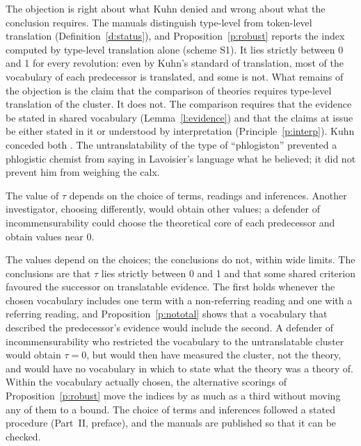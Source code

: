 \documentclass{situationist-preprint}
\begin{document}
\begin{reply}
The objection is right about what Kuhn denied and wrong about what the conclusion requires. The manuals distinguish type-level from token-level translation (Definition~\ref{d:status}), and Proposition~\ref{p:robust} reports the index computed by type-level translation alone (scheme S1). It lies strictly between 0 and 1 for every revolution: even by Kuhn's standard of translation, most of the vocabulary of each predecessor is translated, and some is not. What remains of the objection is the claim that the comparison of theories requires type-level translation of the cluster. It does not. The comparison requires that the evidence be stated in shared vocabulary (Lemma~\ref{l:evidence}) and that the claims at issue be either stated in it or understood by interpretation (Principle~\ref{p:interp}). Kuhn conceded both \citep{Kuhn1983}. The untranslatability of the type of \enquote{phlogiston} prevented a phlogistic chemist from saying in Lavoisier's language what he believed; it did not prevent him from weighing the calx.
\end{reply}

\begin{objection}
The value of $\tau$ depends on the choice of terms, readings and inferences. Another investigator, choosing differently, would obtain other values; a defender of incommensurability could choose the theoretical core of each predecessor and obtain values near 0.
\end{objection}

\begin{reply}
The values depend on the choices; the conclusions do not, within wide limits. The conclusions are that $\tau$ lies strictly between 0 and 1 and that some shared criterion favoured the successor on translatable evidence. The first holds whenever the chosen vocabulary includes one term with a non-referring reading and one with a referring reading, and Proposition~\ref{p:nototal} shows that a vocabulary that described the predecessor's evidence would include the second. A defender of incommensurability who restricted the vocabulary to the untranslatable cluster would obtain $\tau=0$, but would then have measured the cluster, not the theory, and would have no vocabulary in which to state what the theory was a theory of. Within the vocabulary actually chosen, the alternative scorings of Proposition~\ref{p:robust} move the indices by as much as a third without moving any of them to a bound. The choice of terms and inferences followed a stated procedure (Part~II, preface), and the manuals are published so that it can be checked.
\end{reply}
\end{document}
